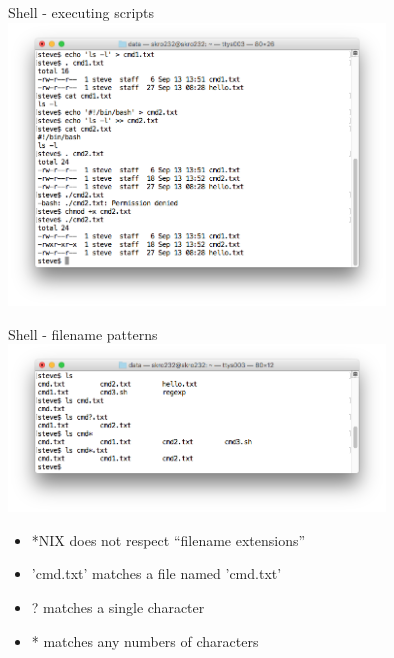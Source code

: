 \documentclass[t]{beamer}
\begin{document}
\begin{frame}{Shell - executing scripts}
  \includegraphics[width=10cm,scale=0.4]{images/scripting.png}
  \note{
}
\end{frame}

\begin{frame}{Shell - filename patterns}
  \includegraphics[width=10cm,scale=0.4]{images/filepat.png}
  \begin{itemize}
  \item *NIX does not respect ``filename extensions''
  \item 'cmd.txt' matches a file named 'cmd.txt'
  \item ? matches a single character
  \item * matches any numbers of characters
  \end{itemize}
  \note{}
\end{frame}
\end{document}
